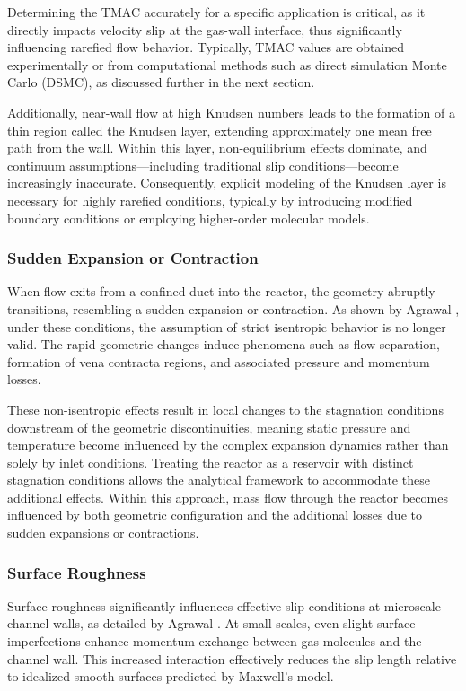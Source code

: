	Determining the TMAC accurately for a specific application is critical, as it directly impacts velocity slip at the gas-wall interface, thus significantly influencing rarefied flow behavior.
	Typically, TMAC values are obtained experimentally or from computational methods such as direct simulation Monte Carlo (DSMC), as discussed further in the next section.

	Additionally, near-wall flow at high Knudsen numbers leads to the formation of a thin region called the Knudsen layer, extending approximately one mean free path from the wall.
	Within this layer, non-equilibrium effects dominate, and continuum assumptions—including traditional slip conditions—become increasingly inaccurate.
	Consequently, explicit modeling of the Knudsen layer is necessary for highly rarefied conditions, typically by introducing modified boundary conditions or employing higher-order molecular models.

\subsubsection*{Sudden Expansion or Contraction}
	When flow exits from a confined duct into the reactor, the geometry abruptly transitions, resembling a sudden expansion or contraction.
	As shown by Agrawal \cite{agrawal_comprehensive_2011}, under these conditions, the assumption of strict isentropic behavior is no longer valid.
	The rapid geometric changes induce phenomena such as flow separation, formation of vena contracta regions, and associated pressure and momentum losses.

	These non-isentropic effects result in local changes to the stagnation conditions downstream of the geometric discontinuities, meaning static pressure and temperature become influenced by the complex expansion dynamics rather than solely by inlet conditions.
	Treating the reactor as a reservoir with distinct stagnation conditions allows the analytical framework to accommodate these additional effects.
	Within this approach, mass flow through the reactor becomes influenced by both geometric configuration and the additional losses due to sudden expansions or contractions.

\subsubsection*{Surface Roughness}
	Surface roughness significantly influences effective slip conditions at microscale channel walls, as detailed by Agrawal \cite{agrawal_comprehensive_2011}.
	At small scales, even slight surface imperfections enhance momentum exchange between gas molecules and the channel wall.
	This increased interaction effectively reduces the slip length relative to idealized smooth surfaces predicted by Maxwell's model.


